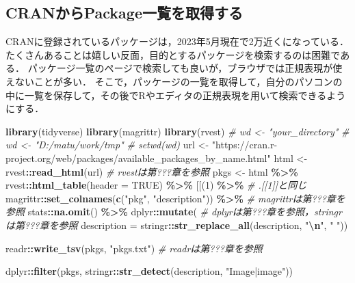 \documentclass[
]{article}
\newenvironment{Shaded}{\begin{snugshade}}{\end{snugshade}}
\newcommand{\AttributeTok}[1]{\textcolor[rgb]{0.13,0.29,0.53}{#1}}
\newcommand{\CommentTok}[1]{\textcolor[rgb]{0.56,0.35,0.01}{\textit{#1}}}
\newcommand{\ConstantTok}[1]{\textcolor[rgb]{0.56,0.35,0.01}{#1}}
\newcommand{\DecValTok}[1]{\textcolor[rgb]{0.00,0.00,0.81}{#1}}
\newcommand{\FunctionTok}[1]{\textcolor[rgb]{0.13,0.29,0.53}{\textbf{#1}}}
\newcommand{\NormalTok}[1]{#1}
\newcommand{\OtherTok}[1]{\textcolor[rgb]{0.56,0.35,0.01}{#1}}
\newcommand{\SpecialCharTok}[1]{\textcolor[rgb]{0.81,0.36,0.00}{\textbf{#1}}}
\newcommand{\StringTok}[1]{\textcolor[rgb]{0.31,0.60,0.02}{#1}}
\begin{document}
\hypertarget{cranux304bux3089packageux4e00ux89a7ux3092ux53d6ux5f97ux3059ux308b}{%
\subsection{CRANからPackage一覧を取得する}\label{cranux304bux3089packageux4e00ux89a7ux3092ux53d6ux5f97ux3059ux308b}}

CRANに登録されているパッケージは，2023年5月現在で2万近くになっている．
たくさんあることは嬉しい反面，目的とするパッケージを検索するのは困難である．
パッケージ一覧のページで検索しても良いが，ブラウザでは正規表現が使えないことが多い．
そこで，パッケージの一覧を取得して，自分のパソコンの中に一覧を保存して，その後でRやエディタの正規表現を用いて検索できるようにする．

\begin{Shaded}
\begin{Highlighting}[]
\FunctionTok{library}\NormalTok{(tidyverse)}
\FunctionTok{library}\NormalTok{(magrittr)}
\FunctionTok{library}\NormalTok{(rvest)}
  \CommentTok{\# wd \textless{}{-} "your\_directory"}
  \CommentTok{\# wd \textless{}{-} "D:/matu/work/tmp"}
  \CommentTok{\# setwd(wd)}
\NormalTok{url }\OtherTok{\textless{}{-}} \StringTok{"https://cran.r{-}project.org/web/packages/available\_packages\_by\_name.html"}
\NormalTok{html }\OtherTok{\textless{}{-}}\NormalTok{ rvest}\SpecialCharTok{::}\FunctionTok{read\_html}\NormalTok{(url)  }\CommentTok{\# rvestは第???章を参照}
\NormalTok{pkgs }\OtherTok{\textless{}{-}}
\NormalTok{  html }\SpecialCharTok{\%\textgreater{}\%}
\NormalTok{  rvest}\SpecialCharTok{::}\FunctionTok{html\_table}\NormalTok{(}\AttributeTok{header =} \ConstantTok{TRUE}\NormalTok{) }\SpecialCharTok{\%\textgreater{}\%}
  \StringTok{\textasciigrave{}}\AttributeTok{[[}\StringTok{\textasciigrave{}}\NormalTok{(}\DecValTok{1}\NormalTok{) }\SpecialCharTok{\%\textgreater{}\%} \CommentTok{\# .[[1]]と同じ}
\NormalTok{  magrittr}\SpecialCharTok{::}\FunctionTok{set\_colnames}\NormalTok{(}\FunctionTok{c}\NormalTok{(}\StringTok{"pkg"}\NormalTok{, }\StringTok{"description"}\NormalTok{)) }\SpecialCharTok{\%\textgreater{}\%} \CommentTok{\# magrittrは第???章を参照}
\NormalTok{  stats}\SpecialCharTok{::}\FunctionTok{na.omit}\NormalTok{() }\SpecialCharTok{\%\textgreater{}\%}
\NormalTok{  dplyr}\SpecialCharTok{::}\FunctionTok{mutate}\NormalTok{( }\CommentTok{\# dplyrは第???章を参照，stringrは第???章を参照}
    \AttributeTok{description =}\NormalTok{ stringr}\SpecialCharTok{::}\FunctionTok{str\_replace\_all}\NormalTok{(description, }\StringTok{"}\SpecialCharTok{\textbackslash{}n}\StringTok{"}\NormalTok{, }\StringTok{" "}\NormalTok{))}

\NormalTok{readr}\SpecialCharTok{::}\FunctionTok{write\_tsv}\NormalTok{(pkgs, }\StringTok{"pkgs.txt"}\NormalTok{) }\CommentTok{\# readrは第???章を参照}

\NormalTok{dplyr}\SpecialCharTok{::}\FunctionTok{filter}\NormalTok{(pkgs, stringr}\SpecialCharTok{::}\FunctionTok{str\_detect}\NormalTok{(description, }\StringTok{"Image|image"}\NormalTok{))}
\end{Highlighting}
\end{Shaded}
\end{document}
